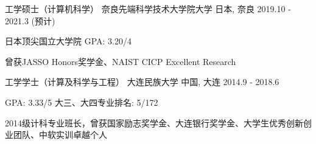 
\begin{cventries}
 \cventry
    {工学硕士（计算机科学）} %
    {奈良先端科学技术大学院大学} %
    {日本, 奈良} %
    {2019.10 - 2021.3 (预计)} %
    {
      \begin{cvitems}
      \item {日本顶尖国立大学院 \quad GPA: 3.20/4}
      \item {曾获JASSO Honors奖学金、NAIST CICP Excellent Research}%
      \end{cvitems}
    }

  \cventry
    {工学学士（计算及科学与工程）} %
    {大连民族大学} %
    {中国, 大连} %
    {2014.9 - 2018.6} %
    {
      \begin{cvitems} %
      \item {GPA: 3.33/5 \quad 大三、大四专业排名: 5/172}
      \item {2014级计科专业班长，曾获国家励志奖学金、大连银行奖学金、大学生优秀创新创业团队、中软实训卓越个人}
      \end{cvitems}
    }

\end{cventries}
